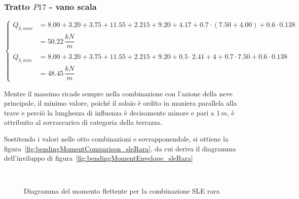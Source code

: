 \subsubsection*{Tratto $P17$ - vano scala}
\begin{equation*}
	\begin{cases}
		Q_{3,max} &= 8.00+3.20+3.75 + 11.55+2.215+9.20 + 4.17 + 0.7\cdot(7.50+4.00) + 0.6\cdot0.138\\
		&= 50.22\,\dfrac{kN}{m}\\\\
		Q_{3,min} &= 8.00+3.20+3.75 + 11.55+2.215+9.20 + 0.5\cdot2.41 + 4+ 0.7\cdot7.50 + 0.6\cdot0.138\\
		&= 48.45\,\dfrac{kN}{m}
	\end{cases}
\end{equation*}

Mentre il massimo ricade sempre nella combinazione con l'azione della neve principale, il minimo valore, poiché il solaio è ordito in maniera parallela alla trave e perciò la lunghezza di influenza è decisamente minore e pari a $1\,m$, è attribuito al sovraccarico di categoria della terrazza.

Sostitendo i valori nelle otto combinazioni e sovrapponendole, si ottiene la figura~\ref{fig:bendingMomentComparison_sleRara}, da cui deriva il diagramma dell'inviluppo di figura~\ref{fig:bendingMomentEnvelope_sleRara}

\begin{figure}
	\centering
	
	\\
	\caption{Diagramma del momento flettente per la combinazione SLE rara}
	\label{fig:bendingMoment_sleRara}
\end{figure}

